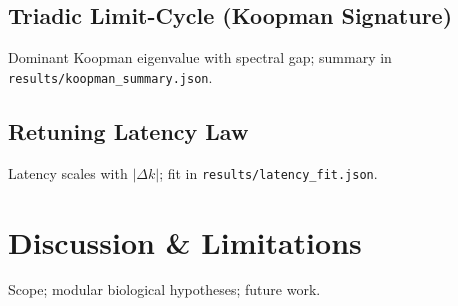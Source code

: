 \documentclass[11pt]{article}
\begin{document}
\subsection{Triadic Limit-Cycle (Koopman Signature)}
Dominant Koopman eigenvalue with spectral gap; summary in \texttt{results/koopman\_summary.json}.
\subsection{Retuning Latency Law}
Latency scales with $|\Delta k|$; fit in \texttt{results/latency\_fit.json}.
\section{Discussion \& Limitations} Scope; modular biological hypotheses; future work.
\end{document}
